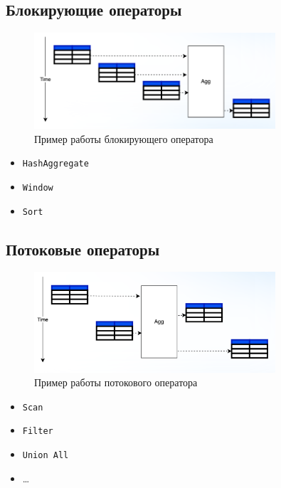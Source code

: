 \documentclass[11pt]{article}
\begin{document}
    \newpage

    \subsection{Блокирующие операторы}

    \begin{figure}[h!]
        \centering
        \includegraphics[width=0.8\textwidth]{Pictures/Push/Operators/Blocking operators}
        \caption{Пример работы блокирующего оператора}
    \end{figure}

    \begin{itemize}
        \item \texttt{HashAggregate}
        \item \texttt{Window}
        \item \texttt{Sort}
    \end{itemize}

    \subsection{Потоковые операторы}

    \begin{figure}[h!]
        \centering
        \includegraphics[width=0.8\textwidth]{Pictures/Push/Operators/Streaming operator}
        \caption{Пример работы потокового оператора}
    \end{figure}

    \begin{itemize}
        \item \texttt{Scan}
        \item \texttt{Filter}
        \item \texttt{Union All}
        \item \dots
    \end{itemize}
\end{document}
